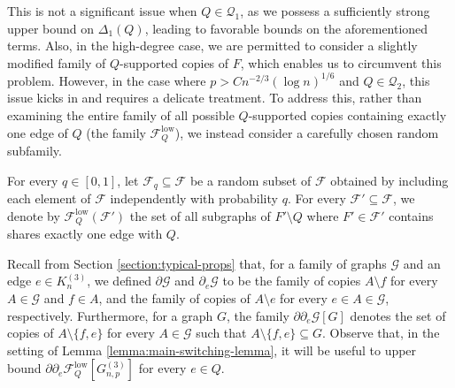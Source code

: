 \documentclass[11pt,a4paper,oneside,reqno]{amsart}
\newcommand{\Gnp}{G_{n, p}^{(3)}}
\newcommand{\cF}{\mathcal{F}}
\newcommand{\cG}{\mathcal{G}}
\newcommand{\cQ}{\mathcal{Q}}
\newcommand{\1}{\mathbbm{1}} %
\newcommand{\cFQL}{\cF_Q^{\mathrm{low}}}
\begin{document}
This is not a significant issue when $Q \in \cQ_1$, as we possess a sufficiently strong upper bound on $\Delta_1(Q)$, leading to favorable bounds on the aforementioned terms. Also, in the high-degree case, we are permitted to consider a slightly modified family of $Q$-supported copies of $F$, which enables us to circumvent this problem. However, in the case where $p > C n^{-2/3} \left(\log n\right)^{1/6}$ and $Q \in \cQ_2$, this issue kicks in and requires a delicate treatment. To address this, rather than examining the entire family of all possible $Q$-supported copies containing exactly one edge of $Q$ (the family $\cFQL$), we instead consider a carefully chosen random subfamily.

For every $q \in [0, 1]$, let $\cF_q \subseteq \cF$ be a random subset of $\cF$ obtained by including each element of $\cF$ independently with probability $q$. For every $\cF' \subseteq \cF$, we denote by $\cFQL(\cF')$ the set of all subgraphs of $F' \setminus Q$ where $F' \in \cF'$ contains shares exactly one edge with $Q$.

Recall from Section \ref{section:typical-props} that, for a family of graphs $\cG$ and an edge $e \in K_n^{(3)}$, we defined $\partial \cG$ and $\partial_e \cG$ to be the family of copies $A \setminus f$ for every $A \in \cG$ and $f \in A$, and the family of copies of $A \setminus e$ for every $e \in A \in \cG$, respectively. Furthermore, for a graph $G$, the family $\partial \partial_e \cG[G]$ denotes the set of copies of $A \setminus \{f, e\}$ for every $A \in \cG$ such that $A \setminus \{f, e\} \subseteq G$. Observe that, in the setting of Lemma \ref{lemma:main-switching-lemma}, it will be useful to upper bound $\partial \partial_e \cFQL\left[\Gnp\right]$ for every $e \in Q$.
\end{document}
